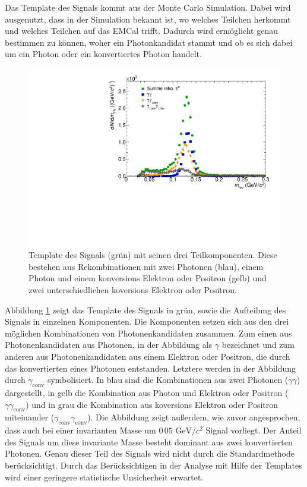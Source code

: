 Das Template des Signals kommt aus der Monte Carlo Simulation.
Dabei wird ausgenutzt, dass in der Simulation bekannt ist, wo welches Teilchen herkommt und welches Teilchen auf das EMCal trifft.
Dadurch wird erm\"oglicht genau bestimmen zu k\"onnen, woher ein Photonkandidat stammt und ob es sich dabei um ein Photon oder ein konvertiertes Photon handelt.
\begin{figure}[tp]
\centering
\includegraphics[width=.75\linewidth]{PeakTemplateMotivation10_Data_2016.pdf}
\caption{Template des Signals (gr\"un) mit seinen drei Teilkomponenten.
Diese bestehen aus Rekombinationen mit zwei Photonen (blau), einem Photon und einem konversions Elektron oder Positron (gelb) und zwei unterschiedlichen koversions Elektron oder Positron.}
\label{fig:SigTemp}
\end{figure}
\newline
Abbildung \ref{fig:SigTemp} zeigt das Template des Signals in gr\"un, sowie die Aufteilung des Signals in einzelnen Komponenten.
Die Komponenten setzen sich aus den drei m\"oglichen Kombinationen von Photonenkandidaten zusammen.
Zum einen aus Photonenkandidaten aus Photonen, in der Abbildung als $\gamma$ bezeichnet und zum anderen aus Photonenkandidaten aus einem Elektron oder Positron, die durch das konvertierten  eines Photonen entstanden.
Letztere werden in der Abbildung durch $\gamma_\text{conv}$ symbolisiert.
\newline
In blau sind die Kombinationen aus zwei Photonen ($\gamma\gamma$) dargestellt, in gelb die Kombination aus Photon und Elektron oder Positron ($\gamma\gamma_\text{conv}$) und in grau die Kombination aus koversions Elektron oder Positron miteinander ($\gamma_\text{conv}\gamma_\text{conv}$).
\newline
Die Abbildung zeigt au{\ss}erdem, wie zuvor angesprochen, dass auch bei einer invarianten Masse um $0\,05 \text{ GeV}/c^{2}$ Signal vorliegt.
Der Anteil des Signals um diese invariante Masse besteht dominant aus zwei konvertierten Photonen.
Genau dieser Teil des Signals wird nicht durch die Standardmethode ber\"ucksichtigt.
Durch das Ber\"ucksichtigen in der Analyse mit Hilfe der Templates wird einer geringere statistische Unsicherheit erwartet.
